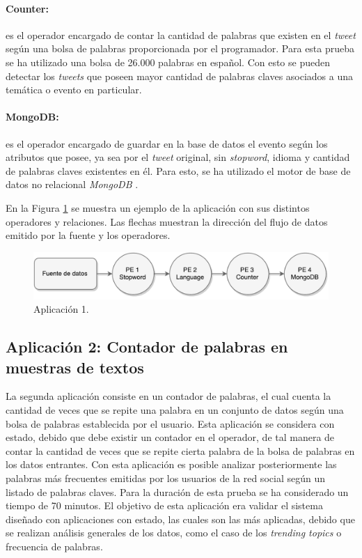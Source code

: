 \paragraph{Counter:} es el operador encargado de contar la cantidad de palabras que existen en el \textit{tweet} según una bolsa de palabras proporcionada por el programador. Para esta prueba se ha utilizado una bolsa de 26.000 palabras en español. Con esto se pueden detectar los \textit{tweets} que poseen mayor cantidad de palabras claves asociados a una temática o evento en particular.

\paragraph{MongoDB:} es el operador encargado de guardar en la base de datos el evento según los atributos que posee, ya sea por el \textit{tweet} original, sin \textit{stopword}, idioma y cantidad de palabras claves existentes en él. Para esto, se ha utilizado el motor de base de datos no relacional \textit{MongoDB} \citep{chodorow2013mongodb}.

En la Figura \ref{fig:primeraAplicacion} se muestra un ejemplo de la aplicación con sus distintos operadores y relaciones. Las flechas muestran la dirección del flujo de datos emitido por la fuente y los operadores.

\begin{figure}[!hb]
	\centering
		\includegraphics[scale=0.75]{images/App1.pdf}
	\caption{Aplicación 1.}
	\label{fig:primeraAplicacion}
\end{figure}

\subsection{Aplicación 2: Contador de palabras en muestras de textos}
La segunda aplicación consiste en un contador de palabras, el cual cuenta la cantidad de veces que se repite una palabra en un conjunto de datos según una bolsa de palabras establecida por el usuario. Esta aplicación se considera con estado, debido que debe existir un contador en el operador, de tal manera de contar la cantidad de veces que se repite cierta palabra de la bolsa de palabras en los datos entrantes. Con esta aplicación es posible analizar posteriormente las palabras más frecuentes emitidas por los usuarios de la red social según un listado de palabras claves. Para la duración de esta prueba se ha considerado un tiempo de 70 minutos. El objetivo de esta aplicación era validar el sistema diseñado con aplicaciones con estado, las cuales son las más aplicadas, debido que se realizan análisis generales de los datos, como el caso de los \textit{trending topics} o frecuencia de palabras.

